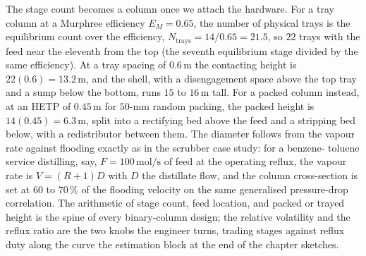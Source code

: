 The stage count becomes a column once we attach the hardware. For a tray
column at a Murphree efficiency $E_M = 0.65$, the number of physical
trays is the equilibrium count over the efficiency, $N_{\text{trays}} =
14/0.65 = 21.5$, so $22$ trays with the feed near the eleventh from the
top (the seventh equilibrium stage divided by the same efficiency). At a
tray spacing of $0.6\,\text{m}$ the contacting height is $22(0.6) =
13.2\,\text{m}$, and the shell, with a disengagement space above the top
tray and a sump below the bottom, runs $15$ to $16\,\text{m}$ tall. For a
packed column instead, at an HETP of $0.45\,\text{m}$ for $50$-mm random
packing, the packed height is $14(0.45) = 6.3\,\text{m}$, split into a
rectifying bed above the feed and a stripping bed below, with a
redistributor between them. The diameter follows from the vapour rate
against flooding exactly as in the scrubber case study: for a benzene-
toluene service distilling, say, $F = 100\,\text{mol/s}$ of feed at the
operating reflux, the vapour rate is $V = (R+1)D$ with $D$ the distillate
flow, and the column cross-section is set at $60$ to $70\,\%$ of the
flooding velocity on the same generalised pressure-drop correlation. The
arithmetic of stage count, feed location, and packed or trayed height is
the spine of every binary-column design; the relative volatility and the
reflux ratio are the two knobs the engineer turns, trading stages against
reflux duty along the curve the estimation block at the end of the
chapter sketches.

